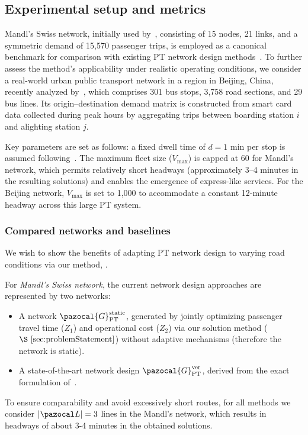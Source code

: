 \documentclass[a4paper,fleqn]{cas-sc}
\begin{document}
\subsection{Experimental setup and metrics}\label{sec:setup}
Mandl’s Swiss network, initially used by~\citet{mandl1980evaluation}, consisting of 15 nodes, 21 links, and a symmetric demand of 15{,}570 passenger trips, is employed as a canonical benchmark for comparison with existing PT network design methods~\citep{liang2025novel, ahern2022approximate}. To further assess the method’s applicability under realistic operating conditions, we consider a real-world urban public transport network in a region in Beijing, China, recently analyzed by~\citet{wu2024multi}, which comprises 301 bus stops, 3,758 road sections, and 29 bus lines. Its origin--destination demand matrix is constructed from smart card data collected during peak hours by aggregating trips between boarding station $i$ and alighting station $j$. 

Key parameters are set as follows: a fixed dwell time of $d=1$ min per stop is assumed following~\citet{chen2022TRSC}. 
The maximum fleet size ($V_{\max}$) is capped at 60 for Mandl’s network, which permits relatively short headways (approximately 3–4 minutes in the resulting solutions) and enables the emergence of express-like services. 
For the Beijing network, $V_{\max}$ is set to 1,000 to accommodate a constant 12-minute headway across this large PT system. 

\subsubsection{Compared networks and baselines}
\label{sec:compared-PT-networks}

We wish to show the benefits of adapting PT network design  to varying road conditions via our method, .

For \emph{Mandl’s Swiss network}, the current network design approaches are represented by two networks:
\begin{itemize}
\item A network $\pazocal{G}_{\text{PT}}^{\text{static}}$, generated by jointly optimizing passenger travel time ($Z_1$) and operational cost ($Z_2$) via our solution method ($\S~\ref{sec:problemStatement}$) without adaptive mechanisms (therefore the network is static).
\item A state-of-the-art network design $\pazocal{G}_{\text{PT}}^{\text{ver}}$, derived from the exact formulation of~\citet{vermeir2021exact}.
\end{itemize}
To ensure comparability and avoid excessively short routes, for all methods we consider $|\pazocal L|=3$ lines in the Mandl's network, which results in headways of about 3-4 minutes in the obtained solutions.
\end{document}
